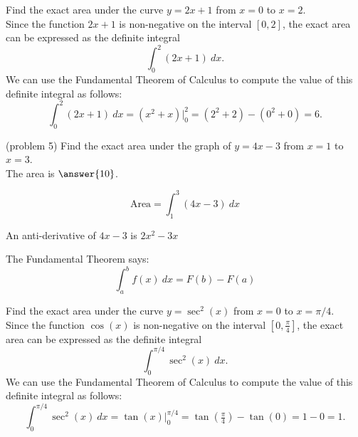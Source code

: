 \documentclass[handout]{ximera}
\begin{document}
\begin{example}[example 5]
Find the exact area under the curve $y = 2x+1$ from $x=0$ to $x= 2$.\\
Since the function $2x+1$ is non-negative on the interval $[0, 2]$, the exact area can be expressed as the definite integral
\[\int_0^2 (2x+1) \ dx.\]
We can use the Fundamental Theorem of Calculus to compute the value of this definite integral as follows:
\[
\int_0^2 (2x+ 1) \ dx = (x^2 + x) \Big|_0^2 = (2^2 + 2) - (0^2 + 0) = 6.
\]



\end{example}


\begin{problem}(problem 5)
Find the exact area under the graph of $y = 4x-3$ from $x = 1$ to $x = 3$.\\
The area is $\answer{10}$.
 \begin{hint}
  \[
  \text{Area} =  \int_1^3 (4x - 3) \ dx
  \]
 \end{hint}
    \begin{hint}
      An anti-derivative of $4x-3$ is $2x^2 - 3x$
    \end{hint}
    \begin{hint}
      The Fundamental Theorem says:
      \[
      \int_a^b f(x) \ dx = F(b) - F(a)
      \]
    \end{hint}    
		
		
\end{problem}


\begin{example}[example 6]
Find the exact area under the curve $y = \sec^2(x)$ from $x=0$ to $x= \pi/4$.\\
Since the function $\cos(x)$ is non-negative on the interval $[0, \frac{\pi}{4}]$, the exact area can be expressed as the definite integral
\[\int_0^{\pi/4} \sec^2(x) \ dx.\]
We can use the Fundamental Theorem of Calculus to compute the value of this definite integral as follows:
\[
\int_0^{\pi/4} \sec^2(x) \ dx = \tan(x) \Big|_0^{\pi/4} = \tan(\tfrac{\pi}{4}) - \tan(0) = 1-0 =1.
\] 


\begin{image}
\end{image}




\end{example}
\end{document}
